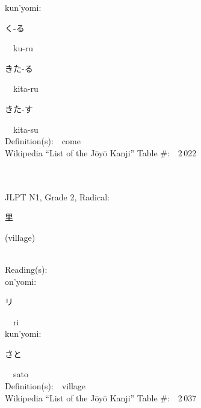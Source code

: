 \begin{multicols}{2}
{\hspace*{1em}}kun'yomi:\ \ \\
{\hspace*{2em}}{\begin{CJK}{UTF8}{min} く-る \end{CJK}}\ \ ku-ru\ \ \\
{\hspace*{2em}}{\begin{CJK}{UTF8}{min} きた-る \end{CJK}}\ \ kita-ru\ \ \\
{\hspace*{2em}}{\begin{CJK}{UTF8}{min} きた-す \end{CJK}}\ \ kita-su\ \ \\
Definition(s):\ \ come \\
Wikipedia ``List of the J\=oy\=o Kanji'' Table \#:\ \ 2\,022 \\
\ \ \\
{\fontsize{34pt}{40pt}  }\ \ \\  %
{JLPT N1, Grade 2, Radical:\ \ {\begin{CJK}{UTF8}{min} 里 \end{CJK}} (village) } \\
Reading(s):\ \ \\
{\hspace*{1em}}on'yomi:\ \ \\
{\hspace*{2em}}{\begin{CJK}{UTF8}{min} リ \end{CJK}}\ \ ri\ \ \\
{\hspace*{1em}}kun'yomi:\ \ \\
{\hspace*{2em}}{\begin{CJK}{UTF8}{min} さと \end{CJK}}\ \ sato\ \ \\
Definition(s):\ \ village \\
Wikipedia ``List of the J\=oy\=o Kanji'' Table \#:\ \ 2\,037 \\
\ \ \\
{\fontsize{34pt}{40pt}  }\ \ \\  %

\end{multicols}
